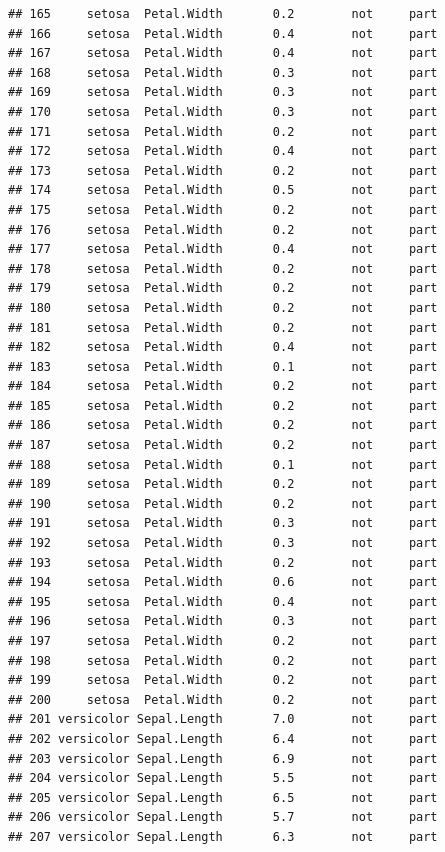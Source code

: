 \documentclass[krantz2]{krantz}\usepackage{knitr}%
\begin{document}
\begin{knitrout}
\begin{kframe}
\begin{verbatim}
## 165     setosa  Petal.Width       0.2        not     part
## 166     setosa  Petal.Width       0.4        not     part
## 167     setosa  Petal.Width       0.4        not     part
## 168     setosa  Petal.Width       0.3        not     part
## 169     setosa  Petal.Width       0.3        not     part
## 170     setosa  Petal.Width       0.3        not     part
## 171     setosa  Petal.Width       0.2        not     part
## 172     setosa  Petal.Width       0.4        not     part
## 173     setosa  Petal.Width       0.2        not     part
## 174     setosa  Petal.Width       0.5        not     part
## 175     setosa  Petal.Width       0.2        not     part
## 176     setosa  Petal.Width       0.2        not     part
## 177     setosa  Petal.Width       0.4        not     part
## 178     setosa  Petal.Width       0.2        not     part
## 179     setosa  Petal.Width       0.2        not     part
## 180     setosa  Petal.Width       0.2        not     part
## 181     setosa  Petal.Width       0.2        not     part
## 182     setosa  Petal.Width       0.4        not     part
## 183     setosa  Petal.Width       0.1        not     part
## 184     setosa  Petal.Width       0.2        not     part
## 185     setosa  Petal.Width       0.2        not     part
## 186     setosa  Petal.Width       0.2        not     part
## 187     setosa  Petal.Width       0.2        not     part
## 188     setosa  Petal.Width       0.1        not     part
## 189     setosa  Petal.Width       0.2        not     part
## 190     setosa  Petal.Width       0.2        not     part
## 191     setosa  Petal.Width       0.3        not     part
## 192     setosa  Petal.Width       0.3        not     part
## 193     setosa  Petal.Width       0.2        not     part
## 194     setosa  Petal.Width       0.6        not     part
## 195     setosa  Petal.Width       0.4        not     part
## 196     setosa  Petal.Width       0.3        not     part
## 197     setosa  Petal.Width       0.2        not     part
## 198     setosa  Petal.Width       0.2        not     part
## 199     setosa  Petal.Width       0.2        not     part
## 200     setosa  Petal.Width       0.2        not     part
## 201 versicolor Sepal.Length       7.0        not     part
## 202 versicolor Sepal.Length       6.4        not     part
## 203 versicolor Sepal.Length       6.9        not     part
## 204 versicolor Sepal.Length       5.5        not     part
## 205 versicolor Sepal.Length       6.5        not     part
## 206 versicolor Sepal.Length       5.7        not     part
## 207 versicolor Sepal.Length       6.3        not     part

\end{verbatim}
\end{kframe}
\end{knitrout}
\end{document}
